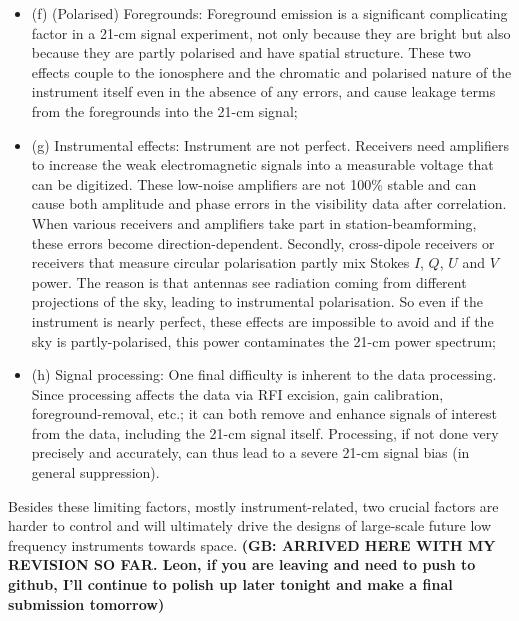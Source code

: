 \begin{itemize}
\item (f) (Polarised) Foregrounds: Foreground emission is a significant complicating factor in a 21-cm signal experiment, not only because they are bright but also because they are partly polarised and have spatial structure. These two effects couple to the ionosphere and the chromatic and polarised nature of the instrument itself even in the absence of any errors, and cause leakage terms from the foregrounds into the 21-cm signal; 
%
\item (g) Instrumental effects: Instrument are not perfect. Receivers need amplifiers to increase the weak electromagnetic signals into a measurable voltage that can be digitized. These low-noise amplifiers are not 100\% stable and can cause both amplitude and phase errors in the visibility data after correlation. When various receivers and amplifiers take part in station-beamforming, these errors become direction-dependent. Secondly, cross-dipole receivers or receivers that measure circular polarisation partly mix Stokes $I$, $Q$, $U$ and $V$ power. The reason is that antennas see radiation coming from different projections of the sky, leading to instrumental polarisation. So even if the instrument is nearly perfect, these effects are impossible to avoid and if the sky is partly-polarised, this power contaminates the 21-cm power spectrum; 
%
\item (h) Signal processing: One final difficulty is inherent to the data processing. Since processing affects the data via RFI excision, gain calibration, foreground-removal, etc.; it can both remove and enhance signals of interest from the data, including the 21-cm signal itself. Processing, if not done very precisely and accurately, can thus lead to a severe 21-cm signal bias (in general suppression).  
\end{itemize} 

\noindent Besides these limiting factors, mostly instrument-related, two crucial factors are harder to control and will ultimately drive the designs of large-scale future low frequency instruments towards space. {\bf (GB: ARRIVED HERE WITH MY REVISION SO FAR. Leon, if you are leaving and need to push to github, I'll continue to polish up later tonight and make a final submission tomorrow)}\\

